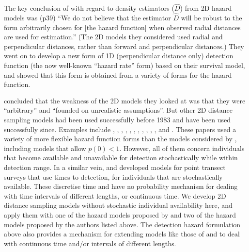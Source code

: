 \documentclass[useAMS,usenatbib,referee]{biom}
\begin{document}
The key conclusion of \cite{Hayes+Buckland:83} with regard to density estimators ($\hat{D}$) from 2D hazard models was (p39) ``We do not believe that the estimator $\hat{D}$ will be robust to the form arbitrarily chosen for [the hazard function] when observed radial distances are used for estimation.'' (The 2D models they considered used radial and perpendicular distances, rather than forward and perpendicular distances.) %
They went on to develop a new form of 1D (perpendicular distance only) detection function (the now well-known ``hazard rate'' form) based on their survival model, and showed that this form is obtained from a variety of forms for the hazard function. 

\cite{Hayes+Buckland:83} concluded that the weakness of the 2D models they looked at was that they were ``arbitrary'' and ``founded on unrealistic assumptions''. But other 2D distance sampling models had been used successfully before 1983 \citep[][for example]{Schweder:74} and have been used successfully since. Examples include \citep{Schweder:90}, \cite{Schweder+al:96}, \cite{Schweder+al:97}, \cite{Schweder+al:99}, \cite{Skaug+Schweder:99}, \cite{Okamura:03}, \cite{Skaug+al:04}, \cite{Okamura+al:03}, \cite{Okamura+al:06}, \cite{Okamura+al:12}, \cite{Borchers+al:13}, \cite{Langrock+al:13} and  \cite{Borchers+Langrock:ip}. These papers used a variety of more flexible hazard function forms than the models considered by \cite{Hayes+Buckland:83}, including models that allow $p(0)<1$. However, all of them concern individuals that become available and unavailable for detection stochastically while within detection range. %
In a similar vein, \cite{Solymos+al:13} and \cite{Amundson+al:14} developed models for point transect surveys that use times to detection, for individuals that are stochastically available. These discretise time and have no probability mechanism for dealing with time intervals of different lengths, or continuous time. We develop 2D distance sampling models without stochastic individual availability here, and apply them with one of the hazard models proposed by \cite{Hayes+Buckland:83} and two of the hazard models proposed by the authors listed above. The detection hazard formulation above also provides a mechanism for extending models like those of \cite{Solymos+al:13} and \cite{Amundson+al:14} to deal with continuous time and/or intervals of different lengths.
\end{document}
